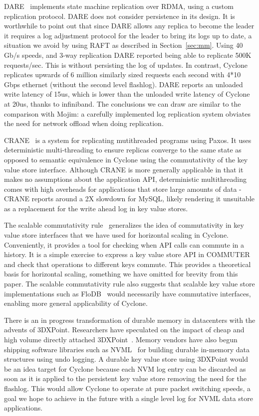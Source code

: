 \documentclass[pageno]{jpaper}
\begin{document}
DARE~\cite{dare} implements state machine replication over RDMA, using a custom
replication protocol. DARE does not consider persistence in its design. It is
worthwhile to point out that since DARE allows any replica to become the leader
it requires a log adjustment protocol for the leader to bring its logs up to
date, a situation we avoid by using RAFT as described in
Section~\ref{sec:mm}. Using 40 Gb/s speeds, and 3-way replication DARE reported
being able to replicate 500K requests/sec. This is without persisting the log of
updates. In contrast, Cyclone replicates upwards of 6 million similarly sized
requests each second with 4*10 Gbps ethernet (without the second level
flashlog). DARE reports an unloaded write latency of 15us, which is lower than
the unloaded write latency of Cyclone at 20us, thanks to infiniband. The
conclusions we can draw are similar to the comparison with Mojim: a carefully
implemented log replication system obviates the need for network offload when
doing replication.

{CRANE}~\cite{crane} is a system for replicating mutithreaded programs using
Paxos. It uses deterministic multi-threading to ensure replicas converge to the
same state as opposed to semantic equivalence in Cyclone using the commutativity
of the key value store interface. Although CRANE is more generally applicable in
that it makes no assumptions about the application API, deterministic
multithreading comes with high overheads for applications that store large
amounts of data - CRANE reports around a 2X slowdown for MySQL, likely rendering
it unsuitable as a replacement for the write ahead log in key value stores.

The scalable commutativity rule~\cite{scalable_commutativity} generalizes the
idea of commutativity in key value store interfaces that we have used for
horizontal scaling in Cyclone. Conveniently, it provides a tool for checking when
API calls can commute in a history. It is a simple exercise to express a key
value store API in COMMUTER and check that operations to different keys
commute. This provides a theoretical basis for horizontal scaling, something we
have omitted for brevity from this paper. The scalable commutativity rule also
suggests that scalable key value store implementations such as
FloDB~\cite{flodb} would necessarily have commutative interfaces, enabling more
general applicability of Cyclone.

There is an in progress transformation of durable memory in datacenters
with the advents of 3DXPoint. Researchers have speculated on the impact of cheap
and high volume directly attached 3DXPoint~\cite{tiering}. Memory vendors have
also begun shipping software libraries such as NVML~\cite{nvml} for building durable
in-memory data structures using undo logging. A durable key value store using
3DXPoint would be an idea target for Cyclone because each NVM log entry can be
discarded as soon as it is applied to the persistent key value store removing
the need for the flashlog. This would allow Cyclone to operate at pure packet
switching speeds, a goal we hope to achieve in the future with a single level
log for NVML data store applications.
\end{document}
